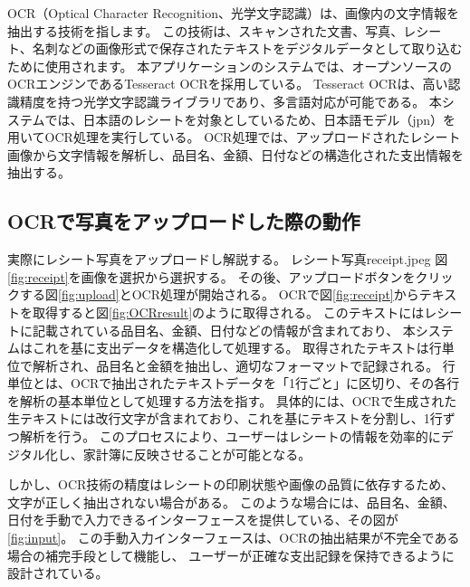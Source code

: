 \documentclass[main]{subfiles}
\begin{document}
OCR（Optical Character Recognition、光学文字認識）は、画像内の文字情報を抽出する技術を指します。
この技術は、スキャンされた文書、写真、レシート、名刺などの画像形式で保存されたテキストをデジタルデータとして取り込むために使用されます。
本アプリケーションのシステムでは、オープンソースのOCRエンジンであるTesseract OCRを採用している。
Tesseract OCRは、高い認識精度を持つ光学文字認識ライブラリであり、多言語対応が可能である。
本システムでは、日本語のレシートを対象としているため、日本語モデル（jpn）を用いてOCR処理を実行している。
OCR処理では、アップロードされたレシート画像から文字情報を解析し、品目名、金額、日付などの構造化された支出情報を抽出する。

\subsection{OCRで写真をアップロードした際の動作}

実際にレシート写真をアップロードし解説する。
レシート写真receipt.jpeg 図\ref{fig:receipt}を画像を選択から選択する。
その後、アップロードボタンをクリックする図\ref{fig:upload}とOCR処理が開始される。
OCRで図\ref{fig:receipt}からテキストを取得すると図\ref{fig:OCRresult}のように取得される。
このテキストにはレシートに記載されている品目名、金額、日付などの情報が含まれており、
本システムはこれを基に支出データを構造化して処理する。
取得されたテキストは行単位で解析され、品目名と金額を抽出し、適切なフォーマットで記録される。
行単位とは、OCRで抽出されたテキストデータを「1行ごと」に区切り、その各行を解析の基本単位として処理する方法を指す。
具体的には、OCRで生成された生テキストには改行文字が含まれており、これを基にテキストを分割し、1行ずつ解析を行う。
このプロセスにより、ユーザーはレシートの情報を効率的にデジタル化し、家計簿に反映させることが可能となる。

しかし、OCR技術の精度はレシートの印刷状態や画像の品質に依存するため、文字が正しく抽出されない場合がある。
このような場合には、品目名、金額、日付を手動で入力できるインターフェースを提供している、その図が\ref{fig:input}。
この手動入力インターフェースは、OCRの抽出結果が不完全である場合の補完手段として機能し、
ユーザーが正確な支出記録を保持できるように設計されている。
\end{document}
